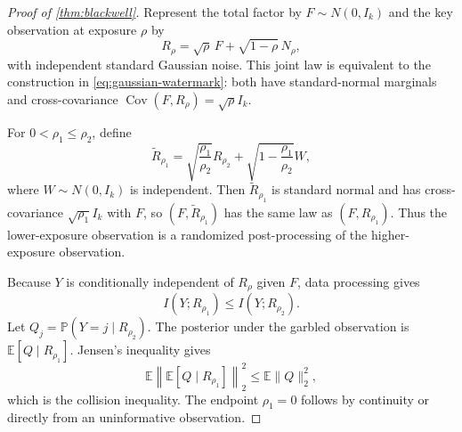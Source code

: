 \documentclass[11pt]{article}
\theoremstyle{definition}
\theoremstyle{remark}
\DeclareMathOperator{\Cov}{Cov}
\newcommand{\E}{\mathbb{E}}
\newcommand{\Pp}{\mathbb{P}}
\begin{document}
\begin{proof}[Proof of \cref{thm:blackwell}]
Represent the total factor by $F\sim N(0,I_k)$ and the key observation at exposure $\rho$ by
\begin{equation}
R_\rho=\sqrt{\rho}\,F+\sqrt{1-\rho}\,N_\rho,
\end{equation}
with independent standard Gaussian noise. This joint law is equivalent to the construction in \eqref{eq:gaussian-watermark}: both have standard-normal marginals and cross-covariance $\Cov(F,R_\rho)=\sqrt{\rho}I_k$.

For $0<\rho_1\le\rho_2$, define
\begin{equation}
\widetilde R_{\rho_1}
=\sqrt{\frac{\rho_1}{\rho_2}}R_{\rho_2}
+\sqrt{1-\frac{\rho_1}{\rho_2}}W,
\end{equation}
where $W\sim N(0,I_k)$ is independent. Then $\widetilde R_{\rho_1}$ is standard normal and has cross-covariance $\sqrt{\rho_1}I_k$ with $F$, so $(F,\widetilde R_{\rho_1})$ has the same law as $(F,R_{\rho_1})$. Thus the lower-exposure observation is a randomized post-processing of the higher-exposure observation.

Because $Y$ is conditionally independent of $R_\rho$ given $F$, data processing gives
\begin{equation}
I(Y;R_{\rho_1})\le I(Y;R_{\rho_2}).
\end{equation}
Let $Q_j=\Pp(Y=j\mid R_{\rho_2})$. The posterior under the garbled observation is $\E[Q\mid R_{\rho_1}]$. Jensen's inequality gives
\begin{equation}
\E\left\|\E[Q\mid R_{\rho_1}]\right\|_2^2
\le \E\|Q\|_2^2,
\end{equation}
which is the collision inequality. The endpoint $\rho_1=0$ follows by continuity or directly from an uninformative observation.
\end{proof}
\end{document}
